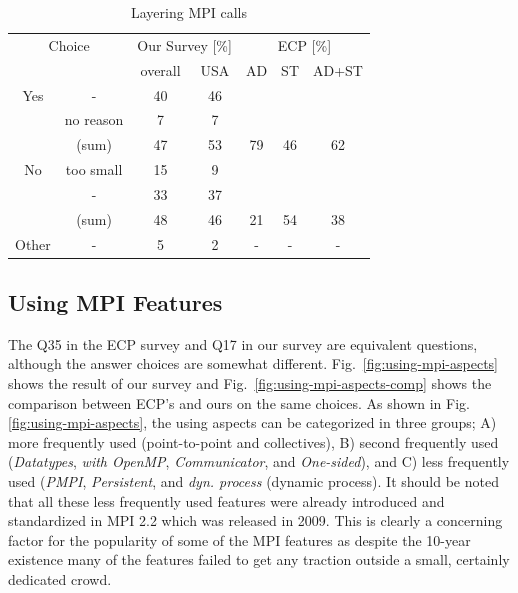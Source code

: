 \documentclass[preprint,5p,times]{elsarticle}
\def\myquote#1{{\it #1}}
\newcommand{\revision}[2]{{\color{blue}#2}}
\begin{document}
\begin{table}[tb]%
  \small%
  \begin{center}%
    \caption{Layering MPI calls}\label{tab:layering-mpi-calls}%
    \vspace{-1.5mm}
    \begin{tabular}{c|c||c|c||c|c|c}%
      \hline%
      \multicolumn{2}{c||}{Choice} & \multicolumn{2}{c||}{Our Survey [\%]} &
      \multicolumn{3}{c}{ECP [\%]} \\
      \cline{3-7}%
      \multicolumn{2}{c||}{} & overall & USA & AD & ST & AD+ST \\
      \hline%
      \hline%
      Yes & - & 40 & 46 & & & \\
      & no reason & 7 & 7 & & & \\
      \cline{2-4}%
      & (sum) & 47 & 53 &  79 & 46 & 62 \\
      \hline%
      \hline%
      No & too small & 15 & 9 & & & \\
      & - & 33 & 37 & & & \\
      \cline{2-4}%
      & (sum) & 48 & 46 & 21 & 54 & 38 \\
      \hline%
      \hline%
      Other & - & 5 & 2 & - & - & - \\
      \hline%
    \end{tabular}%
\vspace{-3mm}%
  \end{center}%
\end{table}%

\subsection{Using MPI Features}\label{sec:mpi-aspects}

The Q35 in the ECP survey and Q17 in our survey are equivalent
questions, although the answer choices are somewhat
different. Fig.~\ref{fig:using-mpi-aspects} shows the result of our
survey and Fig.~\ref{fig:using-mpi-aspects-comp} shows the comparison
between ECP's and ours on the same choices. As shown in
Fig.\ref{fig:using-mpi-aspects}, the
using aspects can be categorized in three groups; A) more frequently
used (point-to-point and collectives), B) second frequently used
(\myquote{Datatypes}, \myquote{with OpenMP}, \myquote{Communicator}, and \myquote{One-sided}), and C) less
frequently used (\myquote{PMPI}, \myquote{Persistent}, and
\myquote{dyn. process} (dynamic process).
%
It should be noted that all these less frequently used features were already
introduced and standardized in MPI 2.2 which was \revision{release}{released} in 2009. This is
clearly a concerning factor for the popularity of some of the MPI features as
despite the 10-year existence many of the features failed to get any traction
outside a small, certainly dedicated crowd.
\end{document}
